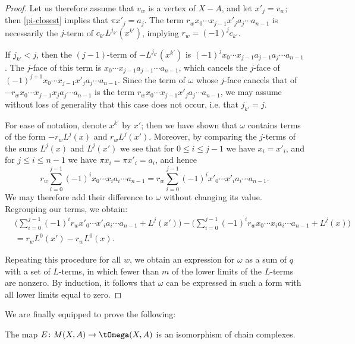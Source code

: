 \begin{proof}
Let us therefore assume that $v_w$ is a vertex of $X-A$, and let $x'_j = v_w$; then \cref{pi-closest} implies that $\pi x'_j = a_j$. The term $r_w x_0 \cdots x_{j-1} x'_j a_{j} \cdots a_{n-1}$ is necessarily the $j$-term of $c_{k'}L^{j_{k'}}(x^{k'})$, implying $r_w = (-1)^j c_{k'}$. 

If $j_{k'} < j$, then the $(j-1)$-term of $-L^{j_{k'}}(x^{k'})$ is $(-1)^{j}x_0 \cdots x_{j-1} a_{j-1} a_{j} \cdots a_{n-1}$. The $j$-face of this term is $x_0 \cdots x_{j-1} a_{j-1} \cdots a_{n-1}$, which cancels the $j$-face of $(-1)^{j+1}x_0 \cdots x_{j-1} x'_j a_{j} \cdots a_{n-1}$. Since the term of $\omega$ whose $j$-face cancels that of $-r_w x_0 \cdots x_{j-1} x_j a_{j} \cdots a_{n-1}$ is the term $r_w x_0 \cdots x_{j-1} x'_j a_{j} \cdots a_{n-1}$, we may assume without loss of generality that this case does not occur, i.e.  that $j_{k'} = j$.

For ease of notation, denote $x^{k'}$ by $x'$; then we have shown that $\omega$ contains terms of the form $-r_w L^j(x)$ and $r_w L^j(x')$. Moreover, by comparing the $j$-terms of the sums $L^j(x)$ and $L^j(x')$ we see that for $0 \leq i \leq j-1$ we have $x_i = x'_i$, and for $j \leq i \leq n - 1$ we have $\pi x_i = \pi x'_i = a_i$, and hence
\[r_w \sum\limits_{i=0}^{j-1} (-1)^i x_0 \cdots x_i a_i \cdots a_{n-1} = r_w \sum\limits_{i=0}^{j-1} (-1)^i x'_0 \cdots x'_i a_i \cdots a_{n-1}.\]
We may therefore add their difference to $\omega$ without changing its value. Regrouping our terms, we obtain:
\begin{align*}
& \Big(\sum\limits_{i=0}^{j-1} (-1)^i r_w x'_0 \cdots x'_i a_i \cdots a_{n-1} + L^j(x')\Big) - \Big(\sum\limits_{i=0}^{j-1} (-1)^i r_w x_0 \cdots x_i a_i \cdots a_{n-1} + L^j(x)\Big) \\
&= r_w L^0(x') - r_w L^0(x).
\end{align*}

Repeating this procedure for all $w$, we obtain an expression for $\omega$ as a sum of $q$ with a set of $L$-terms, in which fewer than $m$ of the lower limits of the $L$-terms are nonzero. By induction, it follows that $\omega$ can be expressed in such a form with all lower limits equal to zero.
\end{proof}
We are finally equipped to prove the following:
\begin{proposition}\label{cone-omega-iso}
The map $E \colon M(X,A) \to \tOmega(X,A)$ is an isomorphism of chain complexes.
\end{proposition}

